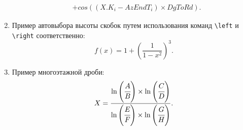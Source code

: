 \begin{enumerate}
{\begin{equation}
\begin{split}
	    &+cos((X.K_i - AzEndT_i)\times DgToRd).
	\label{eq:ф14}
	\end{split}
	\end{equation}
}
\item Пример автовыбора высоты скобок путем использования команд \verb=\left= и \verb=\right= соответственно:
{\zerodisplayskips
	\begin{equation}
	f(x)=1+\left(\frac{1}{1-x^{2}}
	\right)^3.
	\end{equation}
}
\item Пример многоэтажной дроби:
{\zerodisplayskips
	\begin{equation}
	X=\frac{\ln\left(\cfrac{A}{B}\right)\times \ln\left(\cfrac{C}{D}\right)}{\ln\left(\cfrac{E}{F} \right)\times \ln\left(\cfrac{G}{H} \right)}.
	\end{equation}
}
\end{enumerate}	


